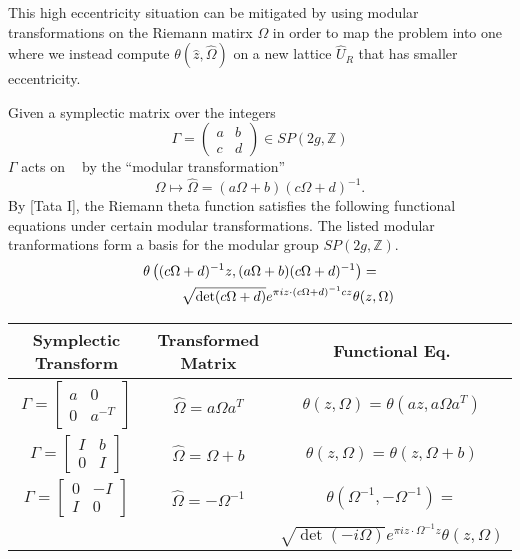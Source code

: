 \documentclass[12]{article}
\DeclareMathOperator{\hg}{\mathfrak{h}_g}
\begin{document}
This high eccentricity situation can be mitigated by using modular
transformations on the Riemann matirx $\Omega$ in order to map the problem into
one where we instead compute $\theta(\hat{z}, \hat{\Omega})$ on a new lattice
$\hat{U}_R$ that has smaller eccentricity.

Given a symplectic matrix over the integers
\[
\Gamma = \left( \begin{matrix} a & b \\ c & d \end{matrix} \right)
\in SP(2g,\mathbb{Z})
\]
$\Gamma$ acts on $\hg$ by the ``modular transformation''
\[
\Omega \mapsto \hat{\Omega} = (a\Omega + b) (c\Omega + d)^{-1}.
\]
By [Tata I], the Riemann theta function satisfies the following functional
equations under certain modular transformations. The listed modular
tranformations form a basis for the modular group $SP(2g, \mathbb{Z})$.
\begin{gather} \label{eqn: full transformation}
\theta \left( 
(c \Omega + d)^{-1} z, (a \Omega + b)(c \Omega + d)^{-1}
\right) = \notag \\
\qquad \qquad
\sqrt{\det(c \Omega + d)}
e^{\pi i z \cdot (c \Omega + d)^{-1} c z}
\theta(z, \Omega)
\end{gather}


\begin{table}[h]
\label{tbl: transformations}

\centering
\begin{tabular}{ccc}
  Symplectic Transform & Transformed Matrix & Functional Eq. \\ \hline
  $\Gamma = \left[ \begin{smallmatrix} a & 0 \\ 0 &
      a^{-T} \end{smallmatrix} \right]$ & $\hat{\Omega} = a \Omega
  a^T$ & $\theta(z,\Omega) = \theta(az,a\Omega a^T)$ \\

  $\Gamma = \left[ \begin{smallmatrix} I & b \\ 0 &
      I \end{smallmatrix} \right]$ & $\hat{\Omega} = \Omega + b$ &
  $\theta(z,\Omega) = \theta(z, \Omega + b)$ \\

  $\Gamma = \left[ \begin{smallmatrix} 0 & -I \\ I &
      0 \end{smallmatrix} \right]$ & $\hat{\Omega} = -\Omega^{-1}$ &
  $\theta(\Omega^{-1}, -\Omega^{-1}) =$ \\

  & & $\sqrt{\det(-i\Omega)}e^{\pi i z \cdot \Omega^{-1} z} \theta(z,\Omega)$
\end{tabular}
\end{table}
\end{document}

